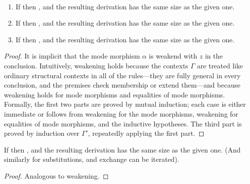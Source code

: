 {\begin{lemma} \label{thm:weakening} ~
\begin{enumerate}
\item If  then
, and the resulting
derivation has the same size as the given one.  
\item If  then
, and the resulting
derivation has the same size as the given one.  
\item If  then
, and the resulting
derivation has the same size as the given one.  
\end{enumerate}
\end{lemma}
\begin{proof}
It is implicit that the mode morphism $\alpha$ is weakend with $z$ in
the conclusion.  Intuitively, weakening holds because the contexts
$\Gamma$ are treated like ordinary structural contexts in all of the
rules---they are fully general in every conclusion, and the premises
check membership or extend them---and because weakening holds for mode
morphisms and equalities of mode morphisms.  Formally, the first two
parts are proved by mutual induction; each case is either immediate
or follows from weakening for the mode morphisms, weakening for
equalities of mode morphisms, and the inductive hypotheses.  The third
part is proved by induction over $\Gamma'$, repeatedly applying the
first part.  
\end{proof}

\begin{lemma}
If  then
, and the resulting derivation
has the same size as the given one.  (And similarly for substitutions,
and exchange can be iterated).  
\end{lemma}
\begin{proof} Analogous to weakening.  
\end{proof}

}
